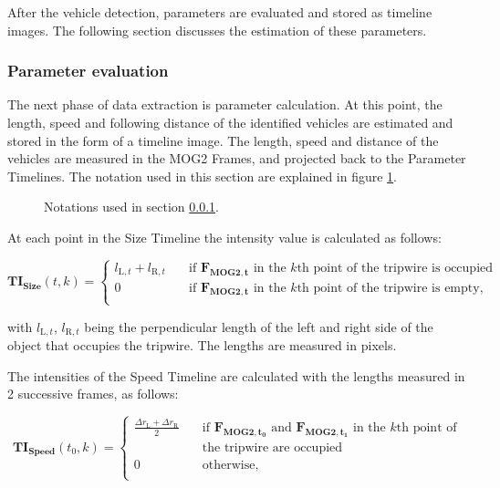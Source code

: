 After the vehicle detection, parameters are evaluated and stored as timeline images.
The following section discusses the estimation of these parameters.

\subsubsection{Parameter evaluation}\label{chap:parameter_evaluation}
The next phase of data extraction is parameter calculation.
At this point, the length, speed and following distance of the identified vehicles are estimated and stored in the form of a timeline image.
The length, speed and distance of the vehicles are measured in the MOG2 Frames, and projected back to the Parameter Timelines.
The notation used in this section are explained in figure \ref{fig:parameter_notations}.

\begin{figure}[!h]
	\centering
	
	\caption{Notations used in section \ref{chap:parameter_evaluation}. \label{fig:parameter_notations}}
\end{figure}

At each point in the Size Timeline the intensity value is calculated as follows:

\begin{displaymath}
 	\boldsymbol{TI_{\text{Size}}}(t,k) = 
	\begin{cases}
	l_{\text{L},t} + l_{\text{R},t}        & \quad \text{if } \boldsymbol{F_{\text{MOG2},t}} \text{ in the } k\text{th} \text{ point of the tripwire is occupied}\\
  	0		& \quad \text{if } \boldsymbol{F_{\text{MOG2},t}} \text{ in the } k\text{th} \text{ point of the tripwire is empty,}\\
	\end{cases}
\end{displaymath}

with $l_{\text{L},t}$, $l_{\text{R},t}$ being the perpendicular length of the left and right side of the object that occupies the tripwire.
The lengths are measured in pixels.

The intensities of the Speed Timeline are calculated with the lengths measured in 2 successive frames, as follows:

\begin{displaymath}
\boldsymbol{TI_{\text{Speed}}}(t_0,k) = 
\begin{cases}
\frac{\Delta r_{\text{L}} + \Delta r_{\text{R}}}{2}      & \quad \text{if } \boldsymbol{F_{\text{MOG2},t_0}} \text{ and } \boldsymbol{F_{\text{MOG2},t_1}} \text{ in the } k\text{th} \text{ point of} \\ & \quad \text{the tripwire are occupied}\\
0		& \quad \text{otherwise,}\\
\end{cases}
\end{displaymath}
 
